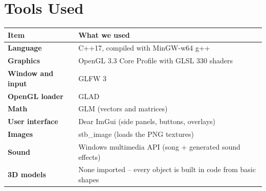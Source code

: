 \documentclass[11pt,a4paper]{article}
\begin{document}
\section{Tools Used}
\begin{table}[H]
\centering\small
{}
\begin{tabularx}{\linewidth}{>{\bfseries}p{3.6cm} L}
\toprule
{}Item & What we used \\ \midrule
Language & C++17, compiled with MinGW-w64 g++ \\
Graphics & OpenGL 3.3 Core Profile with GLSL 330 shaders \\
Window and input & GLFW 3 \\
OpenGL loader & GLAD \\
Math & GLM (vectors and matrices) \\
User interface & Dear ImGui (side panels, buttons, overlays) \\
Images & stb\_image (loads the PNG textures) \\
Sound & Windows multimedia API (song + generated sound effects) \\
3D models & None imported -- every object is built in code from basic shapes \\
\bottomrule
\end{tabularx}
\end{table}

\end{document}
